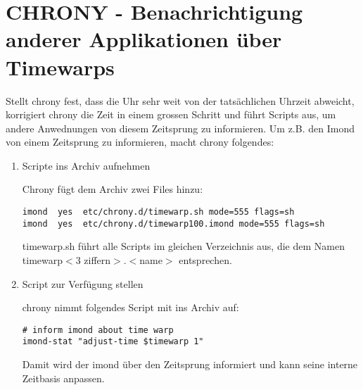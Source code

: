 \section{CHRONY - Benachrichtigung anderer Applikationen über Timewarps}

Stellt chrony fest, dass die Uhr sehr weit von der tatsächlichen
Uhrzeit abweicht, korrigiert chrony die Zeit in einem grossen
Schritt und führt Scripts aus, um andere Anwednungen von diesem Zeitsprung zu informieren.  Um z.B. den Imond von einem Zeitsprung zu informieren, macht
chrony folgendes:

\begin{enumerate}
\item Scripte ins Archiv aufnehmen

Chrony fügt dem Archiv zwei Files hinzu:

\begin{verbatim}
imond  yes  etc/chrony.d/timewarp.sh mode=555 flags=sh
imond  yes  etc/chrony.d/timewarp100.imond mode=555 flags=sh
\end{verbatim}

timewarp.sh führt alle Scripts im gleichen Verzeichnis aus, die dem
Namen timewarp$<$3 ziffern$>$.$<$name$>$ entsprechen.

\item Script zur Verfügung stellen

chrony nimmt folgendes Script mit ins Archiv auf:

\begin{verbatim}
# inform imond about time warp
imond-stat "adjust-time $timewarp 1"
\end{verbatim}

Damit wird der imond über den Zeitsprung informiert und kann seine
interne Zeitbasis anpassen.
\end{enumerate}

